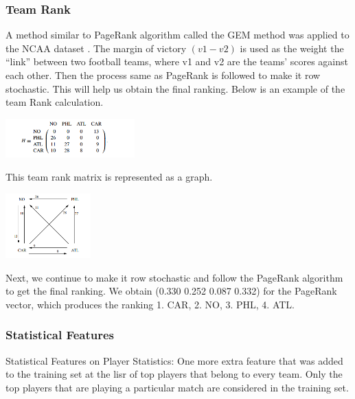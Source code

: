 \documentclass{article}
\begin{document}
\begin{multicols}{2}
\subsubsection{Team Rank}
A method similar to PageRank algorithm called the GEM method was applied to the NCAA dataset \cite{3}.  The margin of victory $(v1-v2)$ is used as the weight the “link” between two football teams, where v1 and v2 are the teams’ scores against each other. Then the process same as PageRank is followed to make it row stochastic. This will help us obtain the final ranking. Below is an example of the team Rank calculation.
	
	\begin{center}
	  \includegraphics[height=15mm]{images/TeamRankMatrix.png}
	\end{center}
	This team rank matrix is represented as a graph.
	\begin{center}
	  \includegraphics[height=25mm]{images/TeamRankGraph.png}
	\end{center}
Next, we continue to make it row stochastic and follow the PageRank algorithm to get the final ranking. We obtain (0.330 0.252 0.087 0.332) for the PageRank vector, which produces the ranking 1. CAR, 2. NO, 3. PHL, 4. ATL.

\subsubsection{Statistical Features}
	Statistical Features on Player Statistics: One more extra feature that was added to the training set at the lisr of top players that belong to every team. Only the top players that are playing a particular match are considered in the training set.


\end{multicols}
\end{document}
